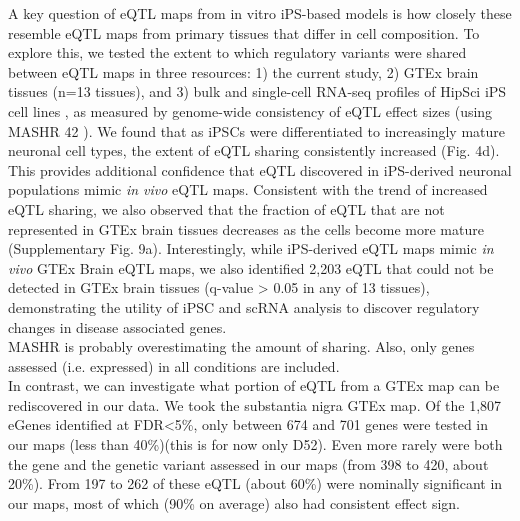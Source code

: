 A key question of eQTL maps from in vitro iPS-based models is how closely these resemble eQTL maps from primary tissues that differ in cell composition. 
To explore this, we tested the extent to which regulatory variants were shared between eQTL maps in three resources: 1) the current study, 2) GTEx brain tissues (n=13 tissues), and 3) bulk and single-cell RNA-seq profiles of HipSci iPS cell lines \cite{bonder2019systematic, cuomo2020single}, as measured by genome-wide consistency of eQTL effect sizes (using MASHR 42 \cite{urbut2019flexible}). 
We found that as iPSCs were differentiated to increasingly mature neuronal cell types, the extent of eQTL sharing consistently increased (Fig. 4d). 
This provides additional confidence that eQTL discovered in iPS-derived neuronal populations mimic \textit{in vivo} eQTL maps. 
Consistent with the trend of increased eQTL sharing, we also observed that the fraction of eQTL that are not represented in GTEx brain tissues decreases as the cells become more mature (Supplementary Fig. 9a). 
Interestingly, while iPS-derived eQTL maps mimic \textit{in vivo} GTEx Brain eQTL maps, we also identified 2,203 eQTL that could not be detected in GTEx brain tissues (q-value > 0.05 in any of 13 tissues), demonstrating the utility of iPSC and scRNA analysis to discover regulatory changes in disease associated genes.\\

MASHR is probably overestimating the amount of sharing.
Also, only genes assessed (i.e. expressed) in all conditions are included.\\

In contrast, we can investigate what portion of eQTL from a GTEx map can be rediscovered in our data.
We took the substantia nigra GTEx map.
Of the 1,807 eGenes identified at FDR<5\%, only between 674 and 701 genes were tested in our maps (less than 40\%)(this is for now only D52). 
Even more rarely were both the gene and the genetic variant assessed in our maps (from 398 to 420, about 20\%).
From 197 to 262 of these eQTL (about 60\%) were nominally significant in our maps, most of which (90\% on average) also had consistent effect sign.


